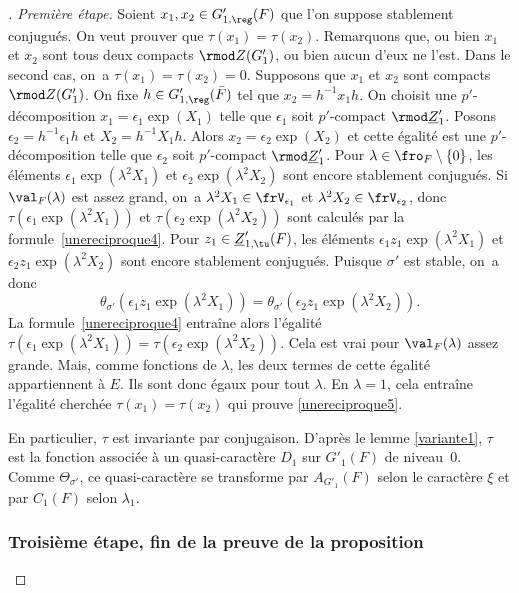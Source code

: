 \begin{proof}[\proofname. Première étape]
Soient $x_{1},x_{2}\in G'_{1,\reg}(F)$ que l'on suppose stablement conjugués. On veut prouver que $\tau(x_{1})=\tau(x_{2})$. Remarquons que, ou bien $x_{1}$ et $x_{2}$ sont tous deux compacts $\rmod Z(G'_{1})$, ou bien aucun d'eux ne l'est. Dans le second cas, on~a \hbox{$\tau(x_{1})=\tau(x_{2})=0$}. Supposons que $x_{1}$ et $x_{2}$ sont compacts $\rmod Z(G'_{1})$. On fixe $h\in G'_{1,\reg}(\bar{F})$ tel que $x_{2}=h^{-1}x_{1}h$. On choisit une $p'$-décomposition $x_{1}=\epsilon_{1}\exp(X_{1})$ telle que $\epsilon_{1}$ soit $p'$-compact $\rmod \underline{Z}'_{1}$. Posons $\epsilon_{2}=h^{-1}\epsilon_{1}h$ et $X_{2}=h^{-1}X_{1}h$. Alors $x_{2}=\epsilon_{2}\exp(X_{2})$ et cette égalité est une $p'$-décomposition telle que $\epsilon_{2}$ soit $p'$-compact $\rmod \underline{Z}'_{1}$. Pour \hbox{$\lambda\in \fro_{F}\setminus\{0\}$}, les éléments $\epsilon_{1}\exp(\lambda^2X_{1})$ et $\epsilon_{2}\exp(\lambda^2X_{2})$ sont encore stablement conjugués. Si $\val_{F}(\lambda)$ est assez grand, on~a $\lambda^2X_{1}\in \frV_{\epsilon_{1}}$ et $\lambda^2X_{2}\in \frV_{\epsilon_{2}}$, donc $\tau(\epsilon_{1}\exp(\lambda^2X_{1}))$ et $\tau(\epsilon_{2}\exp(\lambda^2X_{2}))$ sont calculés par la formule~\eqref{unereciproque4}. Pour $z_{1}\in \underline{Z}'_{1,\tu}(F)$, les éléments $\epsilon_{1}z_{1}\exp(\lambda^2X_{1})$ et $\epsilon_{2}z_{1}\exp(\lambda^2X_{2})$ sont encore stablement conjugués. Puisque $\sigma'$ est stable, on~a donc
\[
\theta_{\sigma'}(\epsilon_{1}z_{1}\exp(\lambda^2X_{1}))=\theta_{\sigma'}(\epsilon_{2}z_{1}\exp(\lambda^2X_{2})).
\]
La formule~\eqref{unereciproque4} entraîne alors l'égalité $\tau(\epsilon_{1}\exp(\lambda^2X_{1}))=\tau(\epsilon_{2}\exp(\lambda^2X_{2}))$. Cela est vrai pour $\val_{F}(\lambda)$ assez grande. Mais, comme fonctions de $\lambda$, les deux termes de cette égalité appartiennent à $E$. Ils sont donc égaux pour tout $\lambda$. En $\lambda=1$, cela entraîne l'égalité cherchée $\tau(x_{1})=\tau(x_{2})$ qui prouve \eqref{unereciproque5}.

En particulier, $\tau$
est invariante par conjugaison. D'après le lemme \ref{variante1}, $\tau$ est la fonction associée à un quasi-caractère $D_{1}$ sur $G'_{1}(F)$ de niveau~$0$. Comme $\Theta_{\sigma'}$, ce quasi-caractère se transforme par $A_{G'_{1}}(F)$ selon le caractère $\xi$ et par $C_{1}(F)$ selon $\lambda_{1}$.

\subsubsection*{Troisième étape, fin de la preuve de la proposition}


\end{proof}
